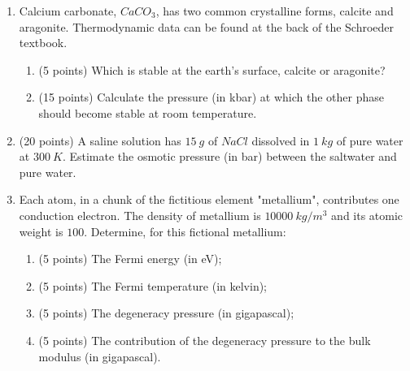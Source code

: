 \documentclass[fleqn]{article}
\begin{document}
\begin{enumerate}
\begin{enumerate}
    \end{enumerate}

    \pagebreak

    \item Calcium carbonate, $CaCO_3$, has two common crystalline forms, calcite and aragonite. Thermodynamic 
    data can be found at the back of the Schroeder textbook.
    \begin{enumerate}
      \item (5 points) Which is stable at the earth's surface, calcite or aragonite?

      \item (15 points) Calculate the pressure (in kbar) at which the other phase should become stable
      at room temperature.

    \end{enumerate}

    \pagebreak

    \item (20 points) A saline solution has $15 ~ g$ of $NaCl$ dissolved in $1 ~ kg$ of pure water at $300 ~ K$. Estimate
    the osmotic pressure (in bar) between the saltwater and pure water.

    \pagebreak

    \item Each atom, in a chunk of the fictitious element "metallium", contributes one conduction electron. 
    The density of metallium is $10000 ~ kg/m^3$ and its atomic weight is $100$. Determine, for
    this fictional metallium:
    \begin{enumerate}
      \item (5 points) The Fermi energy (in eV);

      \item (5 points) The Fermi temperature (in kelvin);

      \item (5 points) The degeneracy pressure (in gigapascal);

      \item (5 points) The contribution of the degeneracy pressure to the bulk modulus (in gigapascal).

    \end{enumerate}

  \end{enumerate}
\end{document}
